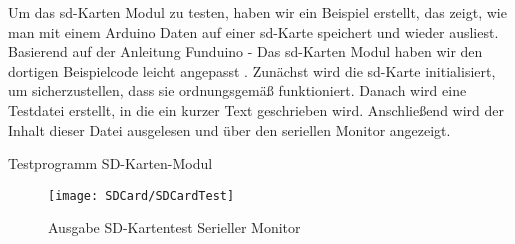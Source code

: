 Um das \ac{sd}-Karten Modul zu testen, haben wir ein Beispiel erstellt, das zeigt, wie man mit einem Arduino Daten auf einer \ac{sd}-Karte speichert und wieder ausliest. Basierend auf der Anleitung Funduino - Das \ac{sd}-Karten Modul haben wir den dortigen Beispielcode leicht angepasst \cite{AZ-Delivery:2021}. Zunächst wird die \ac{sd}-Karte initialisiert, um sicherzustellen, dass sie ordnungsgemäß funktioniert. Danach wird eine Testdatei erstellt, in die ein kurzer Text geschrieben wird. Anschließend wird der Inhalt dieser Datei ausgelesen und über den seriellen Monitor angezeigt.

\begin{code}[h]
    \caption{Testprogramm SD-Karten-Modul} 
    \label{Code:Test_SD_Karten_Modul}
\end{code}

\begin{figure}[h]
    \centering
    \texttt{[image: SDCard/SDCardTest]}
    \caption{Ausgabe SD-Kartentest Serieller Monitor}
    \label{fig:SD_Kartentest_Serieller_Monitor}	
\end{figure}
